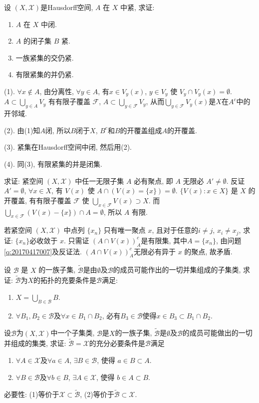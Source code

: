 \bq{}{}
设 $(X,\mathscr{X})$是Hausdorff空间, $A$ 在 $X$ 中紧, 求证:
\begin{enumerate}[(1)]
 \item $A$ 在 $X$ 中闭.
 \item $A$ 的闭子集 $B$ 紧.
 \item 一族紧集的交仍紧.
 \item 有限紧集的并仍紧.
\end{enumerate}
\eq
\ba
(1). $\forall x\notin A$, 由分离性, $\forall y\in A$, 有$x\in V_y(x)$, $y\in V_y$ 使 $V_y\cap V_y(x)=\emptyset$. $A\subset\bigcup_{y\in A}V_y$ 有有限子覆盖 $\mathscr{F}$,
$A\subset\bigcup_{y\in\mathscr{F}}V_y$, 从而$\bigcup_{y\in\mathscr{F}}V_y(x)$是$X$在$A^c$中的开邻域.

(2). 由(1)知$A$闭, 所以$B$闭于$X$, $B^c$和$B$的开覆盖组成$A$的开覆盖.

(3). 紧集在Hausdorff空间中闭, 然后用(2).

(4). 同(3), 有限紧集的并是闭集.
\ea

求证: 紧空间 $(X,\mathscr{X})$ 中任一无限子集 $A$ 必有聚点, 即 $A$ 无限必 $A'\ne\emptyset$.
\eq
\ba
反证 $A'=\emptyset$, $\forall x\in X$, 有 $V(x)$ 使 $A\cap(V(x)=\{x\})=\emptyset$. 
$\{V(x): x\in X\}$ 是 $X$ 的开覆盖, 有有限子覆盖 $\mathscr{F}$ 使 $\bigcup_{x\in\mathscr{F}}V(x)\supset X$.
而 $\bigcup_{x\in\mathscr{F}}(V(x)-\{x\})\cap A=\emptyset$, 所以 $A$ 有限.
\ea

\bq{}{}
若紧空间 $(X,\mathscr{X})$ 中点列 $\{x_n\}$ 只有唯一聚点 $x$, 且对于任意的$i\ne j$, $x_i\ne x_j$, 求证: $\{x_n\}$必收敛于 $x$.
\eq
\ba
只需证 $(A\cap V(x))_A^c$是有限集, 其中$A=\{x_n\}$, 由问题\ref{q:20170417007}及反证法.
$(A\cap V(x))_A^c$无限必有异于 $x$ 的聚点, 故矛盾.
\ea

\bq{}{}
设 $\mathscr{B}$ 是 $X$ 的一族子集, $\widetilde{\mathscr{B}}$是由$\emptyset$及$\mathscr{B}$的成员可能作出的一切并集组成的子集类, 求证:
$\widetilde{\mathscr{B}}$为$X$的拓扑的充要条件是$\mathscr{B}$满足:
\begin{enumerate}[(1)]
 \item $X=\bigcup\limits_{B\in\mathscr{B}}B$.
 \item $\forall B_1, B_2\in \mathscr{B}$及$\forall x\in B_1\cap B_2$, 必有$B_3\in\mathscr{B}$使得$x\in B_3\subset B_1\cap B_2$.
\end{enumerate}
\eq

\bq{}{}
设$\mathscr{B}$为$(X,\mathscr{X})$中一个子集类, $\mathscr{B}$是$X$的一族子集, $\widetilde{\mathscr{B}}$是$\emptyset$及$\mathscr{B}$的成员可能做出的一切并组成的集类,
求证: $\widetilde{\mathscr{B}}=\mathscr{X}$的充分必要条件是$\mathscr{B}$满足
\begin{enumerate}[(1)]
 \item $\forall A\in\mathscr{X}$及$\forall a\in A$, $\exists B\in\mathscr{B}$, 使得 $a\in B\subset A$.
 \item $\forall B\in\mathscr{B}$及$\forall b\in B$, $\exists A\in\mathscr{X}$, 使得 $b\in A\subset B$.
\end{enumerate}
\eq
\ba
必要性: (1)等价于$\mathscr{X}\subset\widetilde{\mathscr{B}}$, (2)等价于$\widetilde{\mathscr{B}}\subset\mathscr{X}$.
\ea

